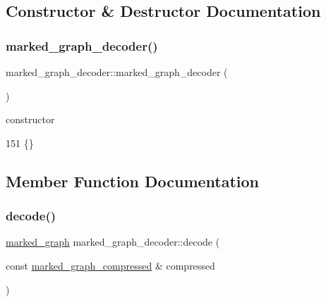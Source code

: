 \subsection{Constructor \& Destructor Documentation}
\mbox{\label{classmarked__graph__decoder_ad13aa15246efd3754b3ba7d2c28300d9}} 
\subsubsection{\texorpdfstring{marked\+\_\+graph\+\_\+decoder()}{marked\_graph\_decoder()}}
{\footnotesize\ttfamily marked\+\_\+graph\+\_\+decoder\+::marked\+\_\+graph\+\_\+decoder (\begin{DoxyParamCaption}{ }\end{DoxyParamCaption})\hspace{0.3cm}{\ttfamily [inline]}}



constructor 


\begin{DoxyCode}
151 \{\}
\end{DoxyCode}


\subsection{Member Function Documentation}
\mbox{\label{classmarked__graph__decoder_a31bbd76091acf5b058fd0a7b7948f74c}} 
\subsubsection{\texorpdfstring{decode()}{decode()}}
{\footnotesize\ttfamily \hyperlink{classmarked__graph}{marked\+\_\+graph} marked\+\_\+graph\+\_\+decoder\+::decode (\begin{DoxyParamCaption}\item[{const \hyperlink{classmarked__graph__compressed}{marked\+\_\+graph\+\_\+compressed} \&}]{compressed }\end{DoxyParamCaption})}


